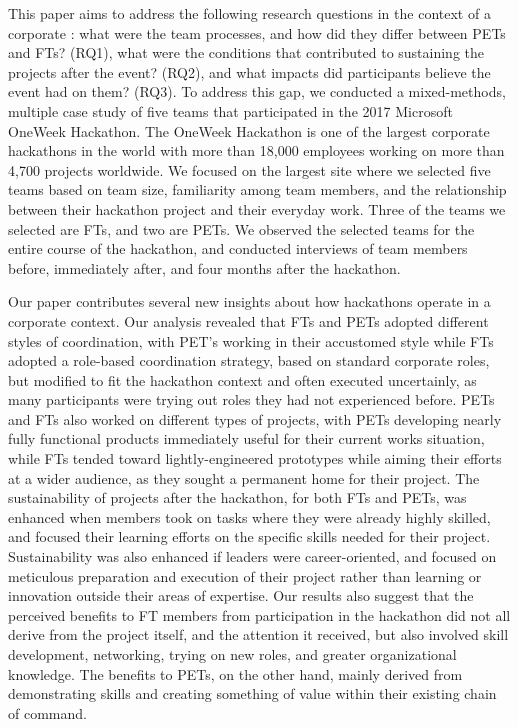 \documentclass{hcij}
\begin{document}
This paper aims to address the following research questions in the context of a corporate \ehackathon: what were the team processes, and how did they differ between PETs and FTs? (RQ1), what were the conditions that contributed to sustaining the projects after the event? (RQ2), and what impacts did participants believe the event had on them? (RQ3). To address this gap, we conducted a mixed-methods, multiple case study of five teams that participated in the 2017 Microsoft OneWeek Hackathon. The OneWeek Hackathon is one of the largest corporate hackathons in the world with more than 18,000 employees working on more than 4,700 projects worldwide. We focused on the largest site where we selected five teams based on team size, familiarity among team members, and the relationship between their hackathon project and their everyday work. Three of the teams we selected are FTs, and two are PETs. We observed the selected teams for the entire course of the hackathon, and conducted interviews of team members before, immediately after, and four months after the hackathon.

Our paper contributes several new insights about how hackathons operate in a corporate context. Our analysis revealed that FTs and PETs adopted different styles of coordination, with PET’s working in their accustomed style while FTs adopted a role-based coordination strategy, based on standard corporate roles, but modified to fit the hackathon context and often executed uncertainly, as many participants were trying out roles they had not experienced before. PETs and FTs also worked on different types of projects, with PETs developing nearly fully functional products immediately useful for their current works situation, while FTs tended toward lightly-engineered prototypes while aiming their efforts at a wider audience, as they sought a permanent home for their project. The sustainability of projects after the hackathon, for both FTs and PETs, was enhanced when members took on tasks where they were already highly skilled, and focused their learning efforts on the specific skills needed for their project. Sustainability was also enhanced if leaders were career-oriented, and focused on meticulous preparation and execution of their project rather than learning or innovation outside their areas of expertise. Our results also suggest that the perceived benefits to FT members from participation in the hackathon did not all derive from the project itself, and the attention it received, but also involved skill development, networking, trying on new roles, and greater organizational knowledge. The benefits to PETs, on the other hand, mainly derived from demonstrating skills and creating something of value within their existing chain of command.
\end{document}
